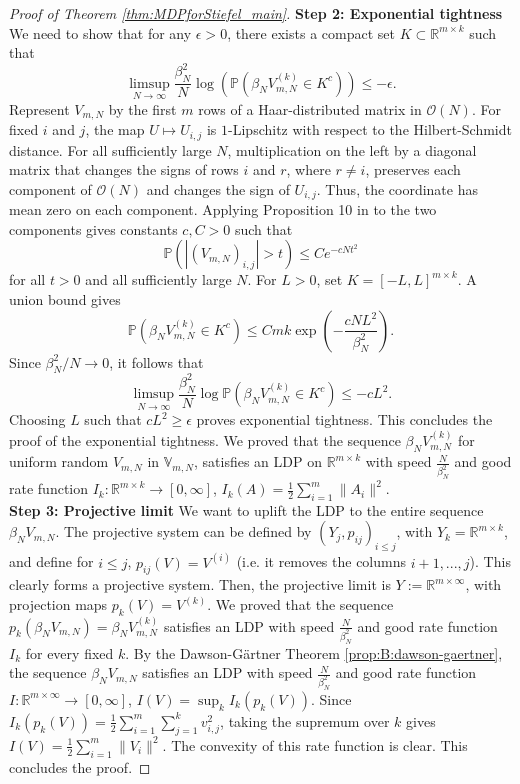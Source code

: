 \documentclass[11pt,a4paper,twoside]{article}
\renewcommand{\P}{\mathbb P}
\newcommand{\R}{\mathbb R}
\renewcommand{\O}{\mathcal O}
\theoremstyle{definition}
\begin{document}
\begin{proof}[Proof of Theorem \ref{thm:MDPforStiefel_main}]
		\noindent\textbf{Step 2: Exponential tightness} 
		We need to show that for any $\epsilon>0$, there exists a compact set $K\subset \R^{m\times k}$ such that
		$$
		\limsup_{N\to\infty}\frac{\beta_N^2}{N}\log(\P(\beta_N V_{m,N}^{(k)}\in K^c)) \le -\epsilon.
		$$
		Represent $V_{m,N}$ by the first $m$ rows of a Haar-distributed matrix in $\O(N)$. For fixed $i$ and $j$, the map $U\mapsto U_{i,j}$ is $1$-Lipschitz with respect to the Hilbert-Schmidt distance. For all sufficiently large $N$, multiplication on the left by a diagonal matrix that changes the signs of rows $i$ and $r$, where $r\ne i$, preserves each component of $\O(N)$ and changes the sign of $U_{i,j}$. Thus, the coordinate has mean zero on each component. Applying Proposition 10 in \cite{meckes2017rates} to the two components gives constants $c,C>0$ such that
		$$
		\P(|(V_{m,N})_{i,j}|>t)\le C e^{-cNt^2}
		$$
		for all $t>0$ and all sufficiently large $N$. For $L>0$, set $K=[-L,L]^{m\times k}$. A union bound gives
		$$
		\P(\beta_N V_{m,N}^{(k)}\in K^c)
		\le Cmk\exp\left(-\frac{cNL^2}{\beta_N^2}\right).
		$$
		Since $\beta_N^2/N\to0$, it follows that
		$$
		\limsup_{N\to\infty}\frac{\beta_N^2}{N}\log\P(\beta_N V_{m,N}^{(k)}\in K^c)\le -cL^2.
		$$
		Choosing $L$ such that $cL^2\ge\epsilon$ proves exponential tightness.
		This concludes the proof of the exponential tightness. We proved that the sequence $\beta_N V_{m,N}^{(k)}$ for uniform random $V_{m,N}$ in $\mathbb{V}_{m,N}$, satisfies an LDP on $\R^{m\times k}$ with speed $\frac{N}{\beta_N^2}$ and good rate function $I_k:\R^{m\times k}\to [0,\infty]$, $I_k(A) = \frac{1}{2}\sum_{i=1}^m \|A_i\|^2$. \\
		
		\noindent\textbf{Step 3: Projective limit} We want to uplift the LDP to the entire sequence $\beta_N V_{m,N}$. The projective system can be defined by $\left({Y}_j, p_{i j}\right)_{i \leq j}$, with ${Y}_k =\R^{m\times k}$, and define for $i\le j$, $p_{ij}(V) = V^{(i)}$ (i.e. it removes the columns $i+1,...,j$). This clearly forms a projective system. Then, the projective limit is ${Y} := \R^{m\times\infty}$, with projection maps $p_k(V) = V^{(k)}$. We proved that the sequence $p_k(\beta_N V_{m,N})= \beta_N V_{m,N}^{(k)}$ satisfies an LDP with speed $\frac{N}{\beta_N^2}$ and good rate function $I_k$ for every fixed $k$. By the Dawson-Gärtner Theorem \ref{prop:B:dawson-gaertner}, the sequence $\beta_N V_{m,N}$ satisfies an LDP with speed $\frac{N}{\beta_N^2}$ and good rate function $I:\R^{m\times \infty}\to [0,\infty]$, $I(V) = \sup_{k}I_k(p_k(V))$. Since $I_k(p_k(V))=\frac{1}{2}\sum_{i=1}^m\sum_{j=1}^k v_{i,j}^2$, taking the supremum over $k$ gives $I(V) = \frac{1}{2}\sum_{i=1}^m \|V_i\|^2$. The convexity of this rate function is clear. This concludes the proof. 
		\end{proof}
		
\end{document}
